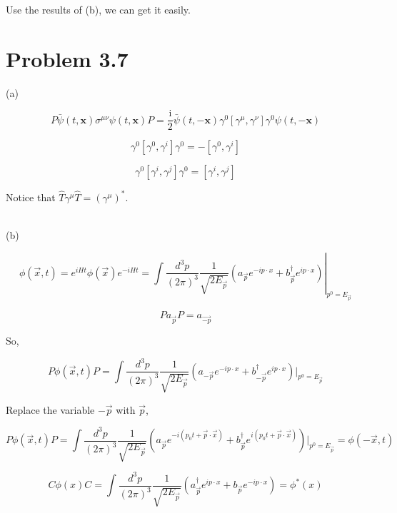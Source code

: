 \documentclass[11pt]{article} %
\begin{document}
Use the results of (b), we can get it easily.



\section{Problem 3.7}

\noindent (a)

\[
    P \bar{\psi}(t, \mathbf{x}) \sigma^{\mu \nu} \psi(t, \mathbf{x}) P=\frac{\mathrm{i}}{2} \bar{\psi}(t,-\mathbf{x}) \gamma^{0}\left[\gamma^{\mu}, \gamma^{\nu}\right] \gamma^{0} \psi(t,-\mathbf{x})
\]

\[
    \gamma^0 [\gamma^0, \gamma^i] \gamma^0 = - [\gamma^0, \gamma^i]
\]

\[
    \gamma^0 [\gamma^i, \gamma^j] \gamma^0 = [\gamma^i, \gamma^j]    
\]

Notice that $\hat{T} \gamma^{\mu} \hat{T} = (\gamma^{\mu})^*$.


~\\
\noindent (b)

\[
    \phi(\vec{x}, t) = e^{i H t} \phi(\vec{x}) e^{-i H t} = \left.\int \frac{d^{3} p}{(2 \pi)^{3}} \frac{1}{\sqrt{2 E_{\vec{p}}}}\left(a_{\vec{p}} e^{-i p \cdot x}+b_{\vec{p}}^{\dagger} e^{i p \cdot x}\right)\right|_{p^{0}=E_{\vec{p}}}    
\]

\[
    P a_{\vec{p}} P = a_{\vec{-p}}
\]

So,

\[
    P \phi(\vec{x}, t) P = \int \frac{d^{3} p}{(2 \pi)^{3}} \frac{1}{\sqrt{2 E_{\vec{p}}}}\left(a_{-\vec{p}} e^{-i p \cdot x}+b_{-\vec{p}}^{\dagger} e^{i p \cdot x}\right) |_{p^{0}=E_{\vec{p}}}
\]

Replace the variable $-\vec{p}$ with $\vec{p}$,

\[
    P \phi(\vec{x}, t) P = \int \frac{d^{3} p}{(2 \pi)^{3}} \frac{1}{\sqrt{2 E_{\vec{p}}}}\left(a_{\vec{p}} e^{-i (p_0 t + \vec{p} \cdot \vec{x})}+b_{\vec{p}}^{\dagger} e^{i (p_0 t + \vec{p} \cdot \vec{x})}\right) |_{p^{0}=E_{\vec{p}}} = \phi(-\vec{x}, t)
\]

\[
    C \phi(x) C = \int \frac{d^{3} p}{(2 \pi)^{3}} \frac{1}{\sqrt{2 E_{\vec{p}}}} (a^{\dagger}_{\vec{p}} e^{i p \cdot x} + b_{\vec{p}} e^{-i p \cdot x}) = \phi^{*}(x)
\]
\end{document}
